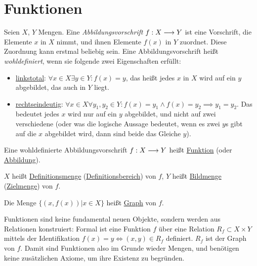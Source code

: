 \section{Funktionen}

\begin{definition}[Funktion] %
    \label{def-function}
    Seien $X$, $Y$ Mengen. Eine \emph{Abbildungsvorschrift} $f: X \longrightarrow Y$ ist eine Vorschrift, die Elemente $x$ in $X$ nimmt, und ihnen Elemente $f(x)$ in $Y$ zuordnet. Diese Zuordnung kann erstmal beliebig sein. Eine Abbildungsvorschrift heißt \emph{wohldefiniert}, wenn sie folgende zwei Eigenschaften erfüllt:
    \begin{itemize}
        \item \underline{linkstotal}: $\forall x \in X \exists y \in Y: f(x) = y$, das heißt jedes $x$ in $X$ wird auf ein $y$ abgebildet, das auch in $Y$ liegt.
        \item \underline{rechtseindeutig}: $\forall x \in X \forall y_1, y_2 \in Y: f(x) = y_1 \land f(x) = y_2 \implies y_1 = y_2$. Das bedeutet jedes $x$ wird nur auf ein $y$ abgebildet, und nicht auf zwei verschiedene (oder was die logische Aussage bedeutet, wenn es zwei $y$s gibt auf die $x$ abgebildet wird, dann sind beide das Gleiche $y$).
    \end{itemize}
    Eine wohldefinierte Abbildungsvorschrift $f: X \longrightarrow Y$ heißt \underline{Funktion} (oder \underline{Abbildung}).
    
    $X$ heißt \underline{Definitionsmenge} (\underline{Definitionsbereich}) von $f$, $Y$ heißt \underline{Bildmenge} (\underline{Zielmenge}) von $f$.

    Die Menge $\{(x, f(x)) | x \in X\}$ heißt \underline{Graph} von $f$.
\end{definition}

\begin{remark}
    Funktionen sind keine fundamental neuen Objekte, sondern werden aus Relationen konstruiert: Formal ist eine Funktion $f$ über eine Relation $R_f \subset X \times Y$ mittels der Identifikation $f(x) = y \iff (x, y) \in R_f$ definiert. $R_f$ ist der Graph von $f$. Damit sind Funktionen also im Grunde wieder Mengen, und benötigen keine zusätzlichen Axiome, um ihre Existenz zu begründen.
\end{remark}

